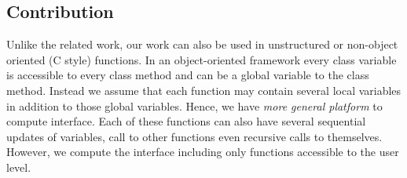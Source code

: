 \documentclass{llncs}
\begin{document}
\subsection{Contribution} 

Unlike the related work, our work can also be used in unstructured or non-object oriented 
(C style) functions.
In an object-oriented framework every class variable is accessible to every class method
and can be a global variable to the class method.
Instead we assume that each function may contain several local variables in addition to those
global variables.
Hence, we have {\em more general platform} to compute interface. 
Each of these functions  can also have several sequential updates of variables, call to other functions
even recursive calls to themselves.
However, we compute the interface including only functions accessible to the user level. 
\end{document}
